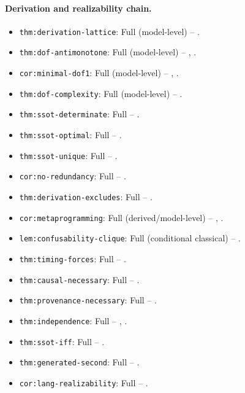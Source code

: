 \paragraph{Derivation and realizability chain.}
\begin{itemize}
\item \nolinkurl{thm:derivation-lattice}: Full (model-level) -- .
\item \nolinkurl{thm:dof-antimonotone}: Full (model-level) -- , .
\item \nolinkurl{cor:minimal-dof1}: Full (model-level) -- , .
\item \nolinkurl{thm:dof-complexity}: Full (model-level) -- .
\item \nolinkurl{thm:ssot-determinate}: Full -- .
\item \nolinkurl{thm:ssot-optimal}: Full -- .
\item \nolinkurl{thm:ssot-unique}: Full -- .
\item \nolinkurl{cor:no-redundancy}: Full -- .
\item \nolinkurl{thm:derivation-excludes}: Full -- .
\item \nolinkurl{cor:metaprogramming}: Full (derived/model-level) -- , .
\item \nolinkurl{lem:confusability-clique}: Full (conditional classical) -- .
\item \nolinkurl{thm:timing-forces}: Full -- .
\item \nolinkurl{thm:causal-necessary}: Full -- .
\item \nolinkurl{thm:provenance-necessary}: Full -- .
\item \nolinkurl{thm:independence}: Full -- , .
\item \nolinkurl{thm:ssot-iff}: Full -- .
\item \nolinkurl{thm:generated-second}: Full -- .
\item \nolinkurl{cor:lang-realizability}: Full -- .
\end{itemize}

